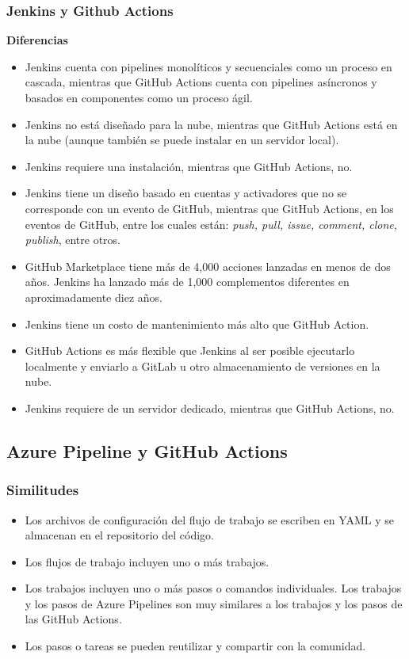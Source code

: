\documentclass[twoside,twocolumn]{article}
\begin{document}
\subsubsection{Jenkins y Github Actions}

\textbf{Diferencias}

\begin{itemize}
    \item Jenkins cuenta con pipelines monolíticos y secuenciales como un proceso en cascada, mientras que GitHub Actions cuenta con pipelines asíncronos y basados en componentes como un proceso ágil.
    \item Jenkins no está diseñado para la nube, mientras que GitHub Actions está en la nube (aunque también se puede instalar en un servidor local).
    \item Jenkins requiere una instalación, mientras que GitHub Actions, no.
    \item Jenkins tiene un diseño basado en cuentas y activadores que no se corresponde con un evento de GitHub, mientras que GitHub Actions, en los eventos de GitHub, entre los cuales están: \textit{push, pull, issue, comment, clone, publish}, entre otros.
    \item GitHub Marketplace tiene más de 4,000 acciones lanzadas en menos de dos años. Jenkins ha lanzado más de 1,000 complementos diferentes en aproximadamente diez años.
    \item Jenkins tiene un costo de mantenimiento más alto que GitHub Action.
    \item GitHub Actions es más flexible que Jenkins al ser posible ejecutarlo localmente y enviarlo a GitLab u otro almacenamiento de versiones en la nube.
    \item Jenkins requiere de un servidor dedicado, mientras que GitHub Actions, no.
\end{itemize}

\subsection{Azure Pipeline y GitHub Actions}

\subsubsection{Similitudes}

\begin{itemize}
    \item Los archivos de configuración del flujo de trabajo se escriben en YAML y se almacenan en el repositorio del código.
    \item Los flujos de trabajo incluyen uno o más trabajos.
    \item Los trabajos incluyen uno o más pasos o comandos individuales. Los trabajos y los pasos de Azure Pipelines son muy similares a los trabajos y los pasos de las GitHub Actions.
    \item Los pasos o tareas se pueden reutilizar y compartir con la comunidad.
\end{itemize}
\end{document}
